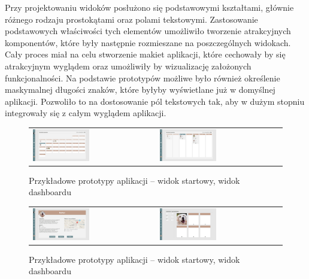 Przy projektowaniu widoków posłużono się podstawowymi kształtami, głównie różnego rodzaju prostokątami oraz polami tekstowymi. Zastosowanie podstawowych właściwości tych elementów umożliwiło tworzenie atrakcyjnych komponentów, które były następnie rozmieszane na poszczególnych widokach. Cały proces miał na celu stworzenie makiet aplikacji, które cechowały by się atrakcyjnym wyglądem oraz umożliwiły by wizualizację założonych funkcjonalności. Na podstawie prototypów możliwe było również określenie maskymalnej długości znaków, które byłyby wyświetlane już w domyślnej aplikacji. Pozwoliło to na dostosowanie pól tekstowych tak, aby w dużym stopniu integrowały się z całym wyglądem aplikacji.
\begin{figure}[H]
    \centering
      \begin{tabular}{@{}ll@{}}
        \includegraphics[width=0.475\textwidth]{rysunki/Home - walk calendar month.png} & 
        \includegraphics[width=0.475\textwidth]{rysunki/Home - walk calendar week.png}
      \end{tabular}
    \caption{Przykładowe prototypy aplikacji -- widok startowy, widok dashboardu}
    \label{fig:mocks-calendars}
\end{figure}
\begin{figure}[H]
    \centering
      \begin{tabular}{@{}ll@{}}
        \includegraphics[width=0.475\textwidth]{rysunki/Home -walk info.png} & 
        \includegraphics[width=0.475\textwidth]{rysunki/Home - dog list.png}
      \end{tabular}
    \caption{Przykładowe prototypy aplikacji -- widok startowy, widok dashboardu}
    \label{fig:mocks-lists}
\end{figure}

